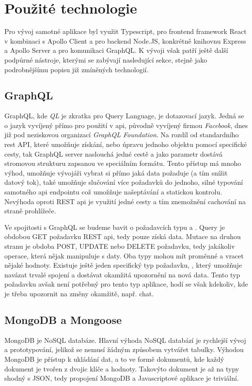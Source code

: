 \section{Použité technologie}
\label{sc:used_techologies}
Pro vývoj samotné aplikace byl využit Typescript, pro frontend framework React v kombinaci s Apollo Client a pro backend Node.JS, konkrétně knihovnu Express a Apollo Server a pro komunikaci GraphQL. K vývoji však patří ještě další podpůrné nástroje, kterými se zabývají nasledující sekce, stejně jako podrobnějšímu popisu již zmíněných technologií.

\subsection{GraphQL}
\label{ss:graphql}
GraphQL, kde \emph{QL} je zkratka pro Query Language, je dotazovací jazyk. Jedná se o jazyk vyvíjený přímo pro použití v \acrshort{api}, původně vyvíjený firmou \emph{Facebook}, dnes již pod neziskovou organizací \emph{GraphQL Foundation}. Na rozdíl od standardního \acrshort{rest} API, které umožňuje získání, nebo úpravu jednoho objektu pomocí specifické cesty, tak GraphQL server naslouchá jedné cestě a jako parametr dostává stromovou strukturu zapsanou ve speciálním formátu. Tento přístup má mnoho výhod, umožňuje vývojáři vybrat si přímo jaká data požaduje (a tím snížit datový tok), také umožňuje slučování více požadavků do jednoho, silné typování samotného \acrshort{api} endpointu což umožňuje našeptávání a statickou kontrolu. Nevýhoda oproti REST \acrshort{api} je využití jedné cesty a tím znemožnění cachování na straně prohlížeče. \cite{brito2020rest}

Ve spojitosti s GraphQL se budeme bavit o požadavcích typu  a . Query je obdobou GET požadavku REST \acrshort{api}, tedy pouze získá data. Mutace na druhou stranu je obdoba POST, UPDATE nebo DELETE požadavku, tedy jakákoliv operace, která nějak manipuluje s daty. Oba typy mohou mít proměnné a vracet nějaké hodnoty. Existuje ještě jeden specifický typ požadavku, , který umožňuje navázat trvalé spojení a dostávat okamžitá upozornění na nová data. Tento typ požadavku avšak není potřebný pro tento typ aplikace, hodí se však kdekoliv, kde je třeba upozornit na změny okamžitě, např. chat. \cite{porcello_2018_learning}

\subsection{MongoDB a Mongoose}
\label{ss:mongoose}
MongoDB je NoSQL databáze. Hlavní výhoda NoSQL databází je rychlejší vývoj a prototypování, jelikož se nemusí žádným způsobem vytvářet tabulky. Výhodou MongoDB je přístup k ukládání dat, a to ve formě dokumentů, kde každý dokument je tvořen z dvojic klíče a hodnoty. Takovýto dokument je až na typy shodný s JSON, tedy propojení MongoDB a Javascriptové aplikace je triviální.

